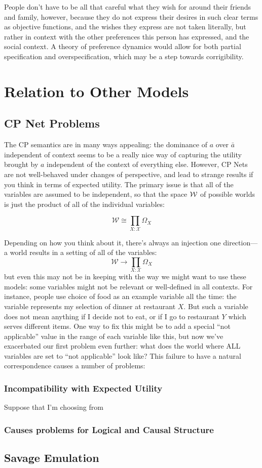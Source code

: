 \documentclass{article}
\theoremstyle{plain}
\theoremstyle{definition}
\theoremstyle{remark}
\begin{document}
	People don't have to be all that careful what they wish for around their friends and family, however, because they do not express their desires in such clear terms as objective functions, and the wishes they express are not taken literally, but rather in context with the other preferences this person has expressed, and the social context. A theory of preference dynamics would allow for both partial specification and overspecification, which may be a step towards corrigibility.
	
	\section{Relation to Other Models}
			
	\subsection{CP Net Problems}
	The CP semantics are in many ways appealing: the dominance of $a$ over $\bar a$ independent of context seems to be a really nice way of capturing the utility brought by $a$ independent of the context of everything else. However, CP Nets are not well-behaved under changes of perspective, and lead to strange results if you think in terms of expected utility. The primary issue is that all of the variables are assumed to be independent, so that the space $\cal W$ of possible worlds is just the product of all of the individual variables:
	
	\[ \mathcal W \cong \prod_{X: \mathcal X} \Omega_X \] 
	
	Depending on how you think about it, there's always an injection one direction--- a world results in a setting of all of the variables:
	\[ \mathcal W \to \prod_{X: \mathcal X} \Omega_X \] 
	but even this may not be in keeping with the way we might want to use these models: some variables might not be relevant or well-defined in all contexts. For instance, people use choice of food as an example variable all the time: the variable represents my selection of dinner at restaurant $X$. But such a variable does not mean anything if I decide not to eat, or if I go to restaurant $Y$ which serves different items. One way to fix this might be to add a special ``not applicable'' value in the range of each variable like this, but now we've exacerbated our first problem even further: what does the world where ALL variables are set to ``not applicable'' look like? This failure to have a natural correspondence causes a number of problems:
	
	\subsubsection{Incompatibility with Expected Utility}
	
	Suppose that I'm choosing from 
	
	\subsubsection{Causes problems for Logical and Causal Structure}
	
	\subsection{Savage Emulation}
	
	\printbibliography
	
\end{document}
